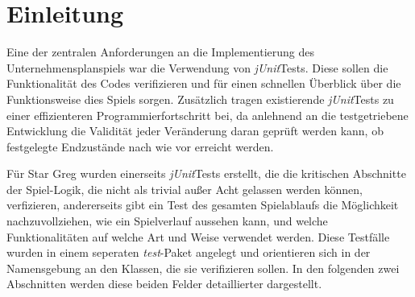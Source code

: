 \section{Einleitung}
\label{sec:junit-einleitung}


\newcommand{\junit}{\textit{jUnit}}

Eine der zentralen Anforderungen an die Implementierung des Unternehmensplanspiels war die Verwendung von \junit Tests. Diese sollen die Funktionalität des Codes verifizieren und für einen schnellen Überblick über die Funktionsweise dies Spiels sorgen. Zusätzlich tragen existierende \junit Tests zu einer effizienteren Programmierfortschritt bei, da anlehnend an die testgetriebene Entwicklung die Validität jeder Veränderung daran geprüft werden kann, ob festgelegte Endzustände nach wie vor erreicht werden.

Für Star Greg wurden einerseits \junit Tests erstellt, die die kritischen Abschnitte der Spiel-Logik, die nicht als trivial außer Acht gelassen werden können, verfizieren, andererseits gibt ein Test des gesamten Spielablaufs die Möglichkeit nachzuvollziehen, wie ein Spielverlauf aussehen kann, und welche Funktionalitäten auf welche Art und Weise verwendet werden. Diese Testfälle wurden in einem seperaten \textit{test}-Paket angelegt und orientieren sich in der Namensgebung an den Klassen, die sie verifizieren sollen. In den folgenden zwei Abschnitten werden diese beiden Felder detaillierter dargestellt.

\autorende{}